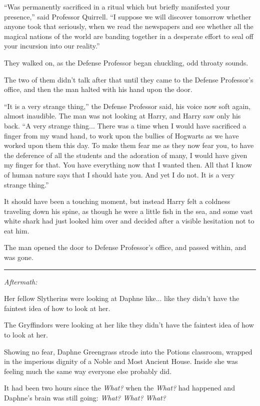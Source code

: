 ``Was permanently sacrificed in a ritual which but briefly manifested
your presence,'' said Professor Quirrell. ``I suppose we will discover
tomorrow whether anyone took that seriously, when we read the newspapers
and see whether all the magical nations of the world are banding
together in a desperate effort to seal off your incursion into our
reality.''

They walked on, as the Defense Professor began chuckling, odd throaty
sounds.

The two of them didn't talk after that until they came to the Defense
Professor's office, and then the man halted with his hand upon the door.

``It is a very strange thing,'' the Defense Professor said, his voice
now soft again, almost inaudible. The man was not looking at Harry, and
Harry saw only his back. ``A very strange thing... There was a time
when I would have sacrificed a finger from my wand hand, to work upon
the bullies of Hogwarts as we have worked upon them this day. To make
them fear me as they now fear you, to have the deference of all the
students and the adoration of many, I would have given my finger for
that. You have everything now that I wanted then. All that I know of
human nature says that I should hate you. And yet I do not. It is a very
strange thing.''

It should have been a touching moment, but instead Harry felt a coldness
traveling down his spine, as though he were a little fish in the sea,
and some vast white shark had just looked him over and decided after a
visible hesitation not to eat him.

The man opened the door to Defense Professor's office, and passed
within, and was gone.

\begin{center}\rule{3in}{0.4pt}\end{center}

\emph{Aftermath:}

Her fellow Slytherins were looking at Daphne like... like they
didn't have the faintest idea of how to look at her.

The Gryffindors were looking at her like they didn't have the faintest
idea of how to look at her.

Showing no fear, Daphne Greengrass strode into the Potions classroom,
wrapped in the imperious dignity of a Noble and Most Ancient House.
Inside she was feeling much the same way everyone else probably did.

It had been two hours since the \emph{What?} when the \emph{What?} had
happened and Daphne's brain was still going: \emph{What? What? What?}

